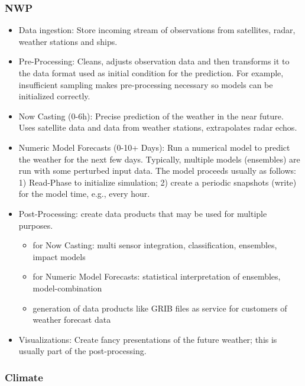 \subsubsection{NWP}
\begin{itemize}
  \item Data ingestion: Store incoming stream of observations from satellites, radar, weather stations and ships.
  \item Pre-Processing: Cleans, adjusts observation data and then transforms it to the data format used as initial condition for the prediction. For example, insufficient sampling makes pre-processing necessary so models can be initialized correctly.
  \item Now Casting (0-6h): Precise prediction of the weather in the near future. Uses satellite data and data from weather stations, extrapolates radar echos.
\item Numeric Model Forecasts (0-10+ Days): Run a numerical model to predict the weather for the next few days. Typically, multiple models (ensembles) are run with some perturbed input data. 	The model proceeds usually as follows: 1) Read-Phase to initialize simulation; 2) create a periodic snapshots (write) for the model time, e.g., every hour.
\item  Post-Processing: create data products that may be used for multiple purposes.
  \begin{itemize}
    \item for Now Casting: multi sensor integration, classification, ensembles, impact models
    \item for Numeric Model Forecasts: statistical interpretation of ensembles, model-combination
    \item generation of data products like GRIB files as service for customers of weather forecast data
  \end{itemize}
\item Visualizations: Create fancy presentations of the future weather; this is usually part of the post-processing.
\end{itemize}

\subsubsection{Climate}

